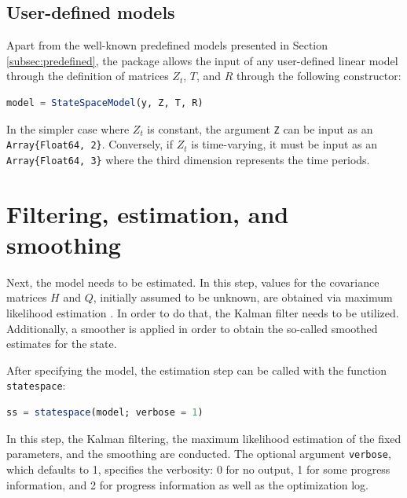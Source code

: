 \documentclass{juliacon}
\begin{document}
\subsection{User-defined models}

Apart from the well-known predefined models presented in Section \ref{subsec:predefined}, the package allows the input of any user-defined linear model through the definition of matrices $Z_{t}$, $T$, and $R$ through the following constructor:
%
\begin{lstlisting}[language = Julia]
model = StateSpaceModel(y, Z, T, R)
\end{lstlisting}

In the simpler case where $Z_{t}$ is constant, the argument \texttt{Z} can be input as an \texttt{Array\{Float64, 2\}}. Conversely, if $Z_{t}$ is time-varying, it must be input as an \texttt{Array\{Float64, 3\}} where the third dimension represents the time periods.

\section{Filtering, estimation, and smoothing} \label{sec:estimation}

Next, the model needs to be estimated. In this step, values for the covariance matrices $H$ and $Q$, initially assumed to be unknown, are obtained via maximum likelihood estimation \cite{casella2002statistical}. In order to do that, the Kalman filter needs to be utilized. Additionally, a smoother is applied in order to obtain the so-called smoothed estimates for the state.

After specifying the model, the estimation step can be called with the function \texttt{statespace}:
%
\begin{lstlisting}[language = Julia]
ss = statespace(model; verbose = 1)
\end{lstlisting}

In this step, the Kalman filtering, the maximum likelihood estimation of the fixed parameters, and the smoothing are conducted. The optional argument \texttt{verbose}, which defaults to 1, specifies the verbosity: 0 for no output, 1 for some progress information, and 2 for progress information as well as the optimization log.
\end{document}

